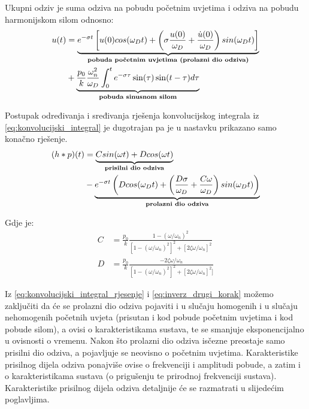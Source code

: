 Ukupni odziv je suma odziva na pobudu početnim uvjetima i odziva na pobudu
harmonijskom silom odnosno:
\begin{equation}
    \begin{split}
    u(t)&=\underbrace{e^{-\sigma t}\left[
		u(0)cos(\omega_Dt)+\left(
                        \sigma\frac{u(0)}{\omega_D}+\frac{\dot{u}(0)}{\omega_D}
                        \right)sin(\omega_Dt) \right]}_{\text{\textbf{pobuda
                    početnim uvjetima (prolazni dio odziva)}}}\\
                    &+\underbrace{
                        \frac{p_0}{k}
                        \frac{\omega_n^2}{\omega_D}
                        \int_0^te^{-\sigma\tau}\sin(\tau)\sin(t-\tau)d\tau
                    }_{\text{\textbf{pobuda sinusnom silom}}}
    \end{split}
    \label{eq:inverz_drugi_korak}
\end{equation}

Postupak određivanja i sređivanja rješenja konvolucijskog integrala iz
\eqref{eq:konvolucijski_integral} je dugotrajan pa je u nastavku prikazano samo konačno 
rješenje.
\begin{equation}
	\begin{split}
	(h*p)(t)&=\underbrace{
			Csin(\omega t)+Dcos(\omega t)
		}_{\text{\textbf{prisilni dio odziva}}}\\
		&-
		\underbrace{
			e^{-\sigma t}
				\left(
				Dcos(\omega_D t) +
					\left(
						\frac{D\sigma}{\omega_D}+\frac{C\omega}{\omega_D}
					\right)
				sin(\omega_Dt)
				\right)
		}_{\text{\textbf{prolazni dio odziva}}}
	\end{split}
    \label{eq:konvolucijski_integral_rjesenje}
\end{equation}

Gdje je:
\begin{align}
    C &= \frac{p_0}{k}\frac{1-(\omega/\omega_n)^2}
            {[1-(\omega/\omega_n)^2]^2+[2\zeta\omega/\omega_n]^2}\label{eq:koef_C}\\
    D &= \frac{p_0}{k}\frac{-2\zeta\omega/\omega_n}
            {[1-(\omega/\omega_n)^2]^2+[2\zeta\omega/\omega_n]^2]}\label{eq:koef_D}
\end{align}

Iz \eqref{eq:konvolucijski_integral_rjesenje} i \eqref{eq:inverz_drugi_korak} možemo
zaključiti da će se prolazni dio odziva pojaviti i u slučaju homogenih i u slučaju
nehomogenih početnih uvjeta (prisutan i kod pobude početnim uvjetima i kod pobude
silom), a ovisi o karakteristikama sustava,
te se smanjuje eksponencijalno u ovisnosti o vremenu. Nakon
što prolazni dio odziva isčezne preostaje samo prisilni dio odziva, a pojavljuje se
neovisno o početnim uvjetima. Karakteristike prisilnog dijela odziva ponajviše ovise
o frekvenciji i amplitudi pobude, a zatim i o karakteristikama sustava (o prigušenju
te prirodnoj frekvenciji sustava). Karakteristike prisilnog dijela odziva detaljnije će se
razmatrati u slijedećim poglavljima.
\newpage

